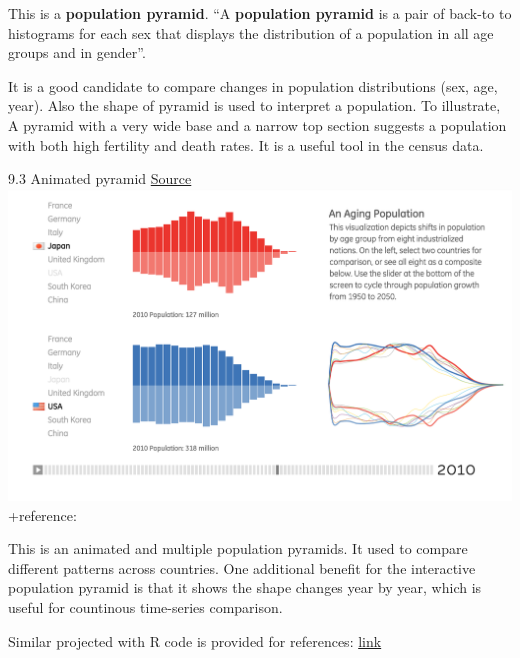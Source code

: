 \documentclass[]{book}
\theoremstyle{definition}
\theoremstyle{definition}
\theoremstyle{definition}
\theoremstyle{remark}
\begin{document}
This is a \textbf{population pyramid}. ``A \textbf{population pyramid}
is a pair of back-to to histograms for each sex that displays the
distribution of a population in all age groups and in gender''.

It is a good candidate to compare changes in population distributions
(sex, age, year). Also the shape of pyramid is used to interpret a
population. To illustrate, A pyramid with a very wide base and a narrow
top section suggests a population with both high fertility and death
rates. It is a useful tool in the census data.

9.3 Animated pyramid \href{https://fathom.info/aging/}{Source}
\includegraphics{images/3_1.png} +reference: \citep{animated_pyramid}

This is an animated and multiple population pyramids. It used to compare
different patterns across countries. One additional benefit for the
interactive population pyramid is that it shows the shape changes year
by year, which is useful for countinous time-series comparison.

Similar projected with R code is provided for references:
\href{https://www.r-bloggers.com/who-is-old-visualizing-the-concept-of-prospective-ageing-with-animated-population-pyramids/}{link}
\end{document}
